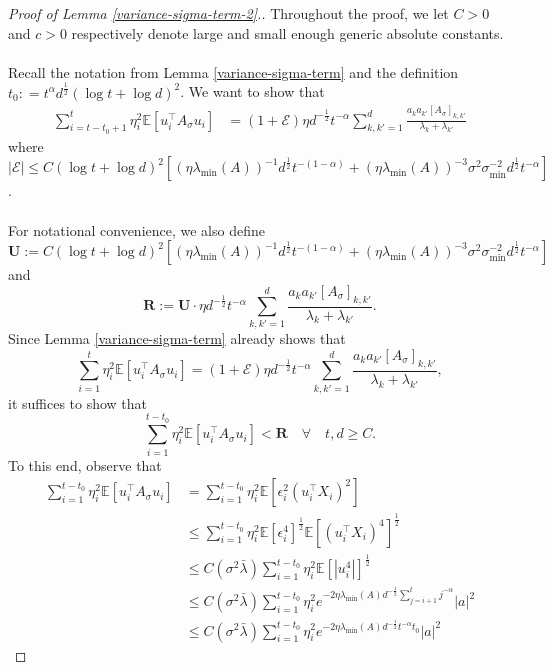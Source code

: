 \documentclass[11pt, reqno,english]{amsart}
\begin{document}
\begin{proof}[Proof of Lemma \ref{variance-sigma-term-2}.]
Throughout the proof, we let $C  > 0$ and $c > 0$ respectively denote large and small enough generic absolute constants.
\\\\
Recall the notation from Lemma \ref{variance-sigma-term} and the definition $t_0 : = t^{\alpha}d^{\frac{1}{2}}(\log t + \log d)^2$. We want to show that
\begin{align*}
    \sum_{i = t-t_0 + 1}^t \eta^2_i \mathbb{E}[u^\top_i A_{\sigma} u_i] &= (1 + \mathcal E) \eta d^{-\frac{1}{2}}t^{-\alpha}\sum_{k,k' = 1}^d \frac{a_k a_{k'}[A_{\sigma}]_{k,k'}}{\lambda_k + \lambda_{k'}}
\end{align*}
where $|\mathcal E| \leq C(\log t + \log d)^2 [(\eta \lambda_{\min}(A))^{-1}d^{\frac{1}{2}}t^{-(1-\alpha)} + (\eta\lambda_{\min}(A))^{-3}\sigma^2\sigma^{-2}_{\min}d^{\frac{1}{2}}t^{-\alpha}]$.
\\\\
For notational convenience, we also define $$\mathbf{U} := C(\log t + \log d)^2 [(\eta \lambda_{\min}(A))^{-1}d^{\frac{1}{2}}t^{-(1-\alpha)} + (\eta\lambda_{\min}(A))^{-3}\sigma^2\sigma^{-2}_{\min}d^{\frac{1}{2}}t^{-\alpha}]$$
and  
$$\mathbf{R} :=  \mathbf{U}\cdot\eta d^{-\frac{1}{2}}t^{-\alpha}\sum_{k,k' = 1}^d \frac{a_k a_{k'}[A_{\sigma}]_{k,k'}}{\lambda_k + \lambda_{k'}}.$$
Since Lemma \ref{variance-sigma-term} already shows that $$\sum_{i = 1}^t \eta^2_i \mathbb{E}[u^\top_i A_{\sigma} u_i] = (1 + \mathcal E)\eta d^{-\frac{1}{2}}t^{-\alpha}\sum_{k,k' = 1}^d \frac{a_k a_{k'}[A_{\sigma}]_{k,k'}}{\lambda_k + \lambda_{k'}},$$ it suffices to show that $$\sum_{i = 1}^{t-t_0} \eta^2_i \mathbb{E}[u^\top_i A_{\sigma} u_i] < \mathbf{R} \quad \forall \quad t,d \geq C.$$
To this end, observe that
\begin{align*}
    \sum_{i = 1}^{t-t_0}\eta^2_i\mathbb{E}[u^\top_i A_{\sigma} u_i] &= \sum_{i = 1}^{t-t_0} \eta^2_i \mathbb{E}[\epsilon^2_i(u^\top_i X_i)^2]
    \\
    &\leq \sum_{i = 1}^{t-t_0}\eta_i^2 \mathbb{E}[\epsilon^4_i]^{\frac{1}{2}}\mathbb{E}[(u^\top_iX_i)^4]^{\frac{1}{2}}
    \\
    &\leq C(\sigma^2 \bar{\lambda})\sum_{i = 1}^{t-t_0}\eta^2_i  \mathbb{E}[|u^4_i|]^{\frac{1}{2}}
    \\
    &\leq C(\sigma^2 \bar{\lambda})\sum_{i = 1}^{t-t_0}\eta^2_ie^{-2\eta \lambda_{\min}(A)d^{-\frac{1}{2}}\sum_{j = i+1}^t j^{-\alpha}}|a|^2
    \\
    &\leq C(\sigma^2 \bar{\lambda})\sum_{i = 1}^{t-t_0}\eta^2_ie^{-2\eta \lambda_{\min}(A)d^{-\frac{1}{2}}t^{-\alpha}t_0}|a|^2

\end{align*}
\end{proof}
\end{document}
